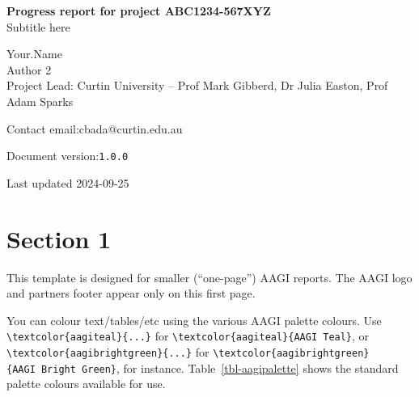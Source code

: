 \documentclass[
]{article}
\begin{document}
\pagestyle{otherpages}
\thispagestyle{firstpage}
\afterpage{\aftergroup\restoregeometry}

  \setlength{\tabcolsep}{12pt}

{\Large\bf Progress report for project ABC1234-567XYZ}\\[4pt]
  {\normalsize Subtitle here}

{\normalsize{%
  Your.Name\\ Author 2\\ Project Lead: Curtin University -- Prof Mark
Gibberd, Dr Julia Easton, Prof Adam Sparks\\[-20pt]
}}

{\normalsize{%
  Contact email:\;cbada@curtin.edu.au\\[-20pt]
}}

{\normalsize{%
  Document version:\;\texttt{1.0.0}\\[-20pt]
}}

Last updated 2024-09-25
\vspace{1mm}



\section{Section 1}\label{section-1}

This template is designed for smaller (``one-page'') AAGI reports. The
AAGI logo and partners footer appear only on this first page.

You can colour text/tables/etc using the various AAGI palette colours.
Use \texttt{\textbackslash{}textcolor\{aagiteal\}\{...\}} for
\texttt{\textbackslash{}textcolor\{aagiteal\}\{AAGI\ Teal\}}, or
\texttt{\textbackslash{}textcolor\{aagibrightgreen\}\{...\}} for
\texttt{\textbackslash{}textcolor\{aagibrightgreen\}\{AAGI\ Bright\ Green\}},
for instance. Table~\ref{tbl-aagipalette} shows the standard palette
colours available for use.

\begin{table}

\caption{\label{tbl-aagipalette}The AAGI palette colours.}


\end{table}%
\end{document}
